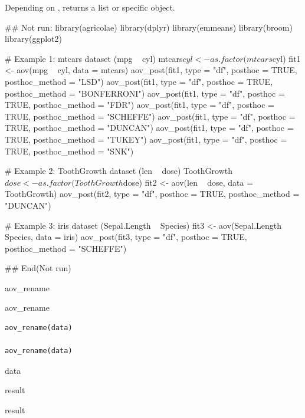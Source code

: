 \documentclass[a4paper]{book}
\begin{document}
%
\begin{Value}
Depending on , returns a list or specific object.
\end{Value}
%
\begin{Examples}
\begin{ExampleCode}
## Not run: 
library(agricolae)
library(dplyr)
library(emmeans)
library(broom)
library(ggplot2)

# Example 1: mtcars dataset (mpg ~ cyl)
mtcars$cyl <- as.factor(mtcars$cyl)
fit1 <- aov(mpg ~ cyl, data = mtcars)
aov_post(fit1, type = "df", posthoc = TRUE, posthoc_method = "LSD")
aov_post(fit1, type = "df", posthoc = TRUE, posthoc_method = "BONFERRONI")
aov_post(fit1, type = "df", posthoc = TRUE, posthoc_method = "FDR")
aov_post(fit1, type = "df", posthoc = TRUE, posthoc_method = "SCHEFFE")
aov_post(fit1, type = "df", posthoc = TRUE, posthoc_method = "DUNCAN")
aov_post(fit1, type = "df", posthoc = TRUE, posthoc_method = "TUKEY")
aov_post(fit1, type = "df", posthoc = TRUE, posthoc_method = "SNK")

# Example 2: ToothGrowth dataset (len ~ dose)
ToothGrowth$dose <- as.factor(ToothGrowth$dose)
fit2 <- aov(len ~ dose, data = ToothGrowth)
aov_post(fit2, type = "df", posthoc = TRUE, posthoc_method = "DUNCAN")

# Example 3: iris dataset (Sepal.Length ~ Species)
fit3 <- aov(Sepal.Length ~ Species, data = iris)
aov_post(fit3, type = "df", posthoc = TRUE, posthoc_method = "SCHEFFE")

## End(Not run)
\end{ExampleCode}
\end{Examples}
%
\begin{Description}
aov\_rename

aov\_rename
\end{Description}
%
\begin{Usage}
\begin{verbatim}
aov_rename(data)

aov_rename(data)
\end{verbatim}
\end{Usage}
%
\begin{Arguments}
\begin{ldescription}
\item[\code{data}] data
\end{ldescription}
\end{Arguments}
%
\begin{Value}
result

result
\end{Value}
\end{document}
